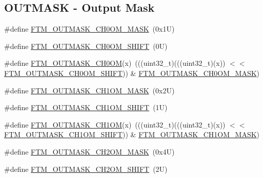 \subsection*{O\+U\+T\+M\+A\+SK -\/ Output Mask}
\begin{DoxyCompactItemize}
\item 
\#define \mbox{\hyperlink{group___f_t_m___register___masks_gae1ed080952e4ddf3947066d5d97b7920}{F\+T\+M\+\_\+\+O\+U\+T\+M\+A\+S\+K\+\_\+\+C\+H0\+O\+M\+\_\+\+M\+A\+SK}}~(0x1\+U)
\item 
\#define \mbox{\hyperlink{group___f_t_m___register___masks_gaae1f8ee6cad97accdeef238387cd160c}{F\+T\+M\+\_\+\+O\+U\+T\+M\+A\+S\+K\+\_\+\+C\+H0\+O\+M\+\_\+\+S\+H\+I\+FT}}~(0\+U)
\item 
\#define \mbox{\hyperlink{group___f_t_m___register___masks_ga29c54f6c0849f286fa7e2b94765732c9}{F\+T\+M\+\_\+\+O\+U\+T\+M\+A\+S\+K\+\_\+\+C\+H0\+OM}}(x)~(((uint32\+\_\+t)(((uint32\+\_\+t)(x)) $<$$<$ \mbox{\hyperlink{group___f_t_m___register___masks_gaae1f8ee6cad97accdeef238387cd160c}{F\+T\+M\+\_\+\+O\+U\+T\+M\+A\+S\+K\+\_\+\+C\+H0\+O\+M\+\_\+\+S\+H\+I\+FT}})) \& \mbox{\hyperlink{group___f_t_m___register___masks_gae1ed080952e4ddf3947066d5d97b7920}{F\+T\+M\+\_\+\+O\+U\+T\+M\+A\+S\+K\+\_\+\+C\+H0\+O\+M\+\_\+\+M\+A\+SK}})
\item 
\#define \mbox{\hyperlink{group___f_t_m___register___masks_gaddee400c7d6e8dca5d318526d6e9cf0c}{F\+T\+M\+\_\+\+O\+U\+T\+M\+A\+S\+K\+\_\+\+C\+H1\+O\+M\+\_\+\+M\+A\+SK}}~(0x2\+U)
\item 
\#define \mbox{\hyperlink{group___f_t_m___register___masks_ga50e5211e18cdbae9c986b49e5ff919f8}{F\+T\+M\+\_\+\+O\+U\+T\+M\+A\+S\+K\+\_\+\+C\+H1\+O\+M\+\_\+\+S\+H\+I\+FT}}~(1\+U)
\item 
\#define \mbox{\hyperlink{group___f_t_m___register___masks_ga0c25f542d434104bac5215c45a111ce6}{F\+T\+M\+\_\+\+O\+U\+T\+M\+A\+S\+K\+\_\+\+C\+H1\+OM}}(x)~(((uint32\+\_\+t)(((uint32\+\_\+t)(x)) $<$$<$ \mbox{\hyperlink{group___f_t_m___register___masks_ga50e5211e18cdbae9c986b49e5ff919f8}{F\+T\+M\+\_\+\+O\+U\+T\+M\+A\+S\+K\+\_\+\+C\+H1\+O\+M\+\_\+\+S\+H\+I\+FT}})) \& \mbox{\hyperlink{group___f_t_m___register___masks_gaddee400c7d6e8dca5d318526d6e9cf0c}{F\+T\+M\+\_\+\+O\+U\+T\+M\+A\+S\+K\+\_\+\+C\+H1\+O\+M\+\_\+\+M\+A\+SK}})
\item 
\#define \mbox{\hyperlink{group___f_t_m___register___masks_gabcfafbb8acba84e561a6023f966991c8}{F\+T\+M\+\_\+\+O\+U\+T\+M\+A\+S\+K\+\_\+\+C\+H2\+O\+M\+\_\+\+M\+A\+SK}}~(0x4\+U)
\item 
\#define \mbox{\hyperlink{group___f_t_m___register___masks_ga9dca78158dd0cbc591569935f052bab4}{F\+T\+M\+\_\+\+O\+U\+T\+M\+A\+S\+K\+\_\+\+C\+H2\+O\+M\+\_\+\+S\+H\+I\+FT}}~(2\+U)

\end{DoxyCompactItemize}
